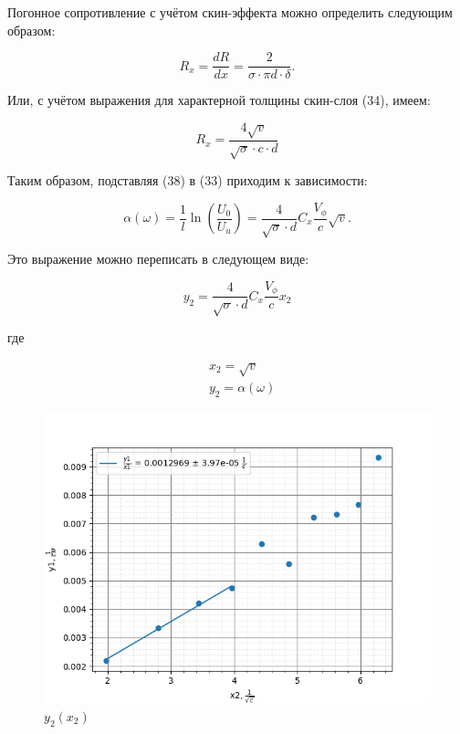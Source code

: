 \documentclass[a4paper,12 pt]{article}
\begin{document}
Погонное сопротивление с учётом скин-эффекта можно определить следующим образом:


\begin{equation*}
R_{x}=\frac{d R}{d x}=\frac{2}{\sigma \cdot \pi d \cdot \delta} . \tag{37}
\end{equation*}


Или, с учётом выражения для характерной толщины скин-слоя (34), имеем:


\begin{equation*}
R_{x}=\frac{4 \sqrt{v}}{\sqrt{\sigma} \cdot c \cdot d} \tag{38}
\end{equation*}


Таким образом, подставляя (38) в (33) приходим к зависимости:


\begin{equation*}
\alpha(\omega)=\frac{1}{l} \ln \left(\frac{U_{0}}{U_{u}}\right)=\frac{4}{\sqrt{\sigma} \cdot d} C_{x} \frac{V_{\phi}}{c} \sqrt{v} . \tag{39}
\end{equation*}


Это выражение можно переписать в следующем виде:


\begin{equation*}
y_{2}=\frac{4}{\sqrt{\sigma} \cdot d} C_{x} \frac{V_{\phi}}{c} x_{2} \tag{40}
\end{equation*}


где


\begin{align*}
& x_{2}=\sqrt{v}  \tag{41}\\
& y_{2}=\alpha(\omega) \tag{42}
\end{align*}


\begin{figure}[H]
    \centering
    \includegraphics[scale=0.7]{y2(x2).png}
    \caption{$y_2(x_2)$}
    \label{fig:enter-label}
\end{figure}
\end{document}
